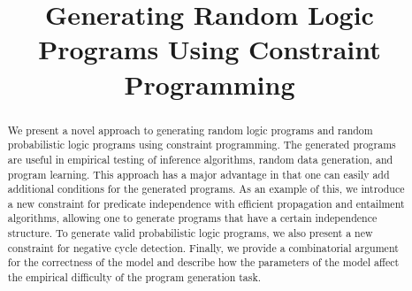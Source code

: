 \documentclass[runningheads]{llncs}
\begin{document}
\title{Generating Random Logic Programs Using Constraint Programming}

\maketitle




\begin{abstract}
  We present a novel approach to generating random logic programs and
  random probabilistic logic programs using constraint programming. The
  generated programs are useful in empirical testing of inference algorithms,
  random data generation, and program learning. This approach has a major
  advantage in that one can easily add additional conditions for the generated
  programs. As an example of this, we introduce a new constraint for predicate
  independence with efficient propagation and entailment algorithms, allowing
  one to generate programs that have a certain independence structure. To
  generate valid probabilistic logic programs, we also present a new constraint
  for negative cycle detection. Finally, we provide a combinatorial argument for
  the correctness of the model and describe how the parameters of the model
  affect the empirical difficulty of the program generation task.

\end{abstract}
\end{document}
